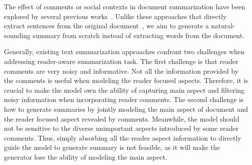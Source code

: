 \documentclass[letterpaper]{article} %
\begin{document}

The effect of comments or social contexts in document summarization have been explored by several previous works~\cite{Hu2008CommentsorientedDS,Yang2011SocialCS,Li2015ReaderAwareMS,li2017reader}.
Unlike these approaches that directly extract sentences from the original document~\cite{Hu2008CommentsorientedDS,Yang2011SocialCS,Li2015ReaderAwareMS}, we aim to generate a natural-sounding summary from scratch instead of extracting words from the document.

Generally, existing text summarization approaches confront two challenges when addressing reader-aware summarization task.
The first challenge is that reader comments are very noisy and informative.
Not all the information provided by the comments is useful when modeling the reader focused aspects.
Therefore, it is crucial to make the model own the ability of capturing main aspect and filtering noisy information when incorporating reader comments.
The second challenge is how to generate summaries by jointly modeling the main aspect of document and the reader focused aspect revealed by comments.
Meanwhile, the model should not be sensitive to the diverse unimportant aspects introduced by some reader comments.
Thus, simply absorbing all the reader aspect information to directly guide the model to generate summary is not feasible, as it will make the generator lose the ability of modeling the main aspect.
\end{document}
